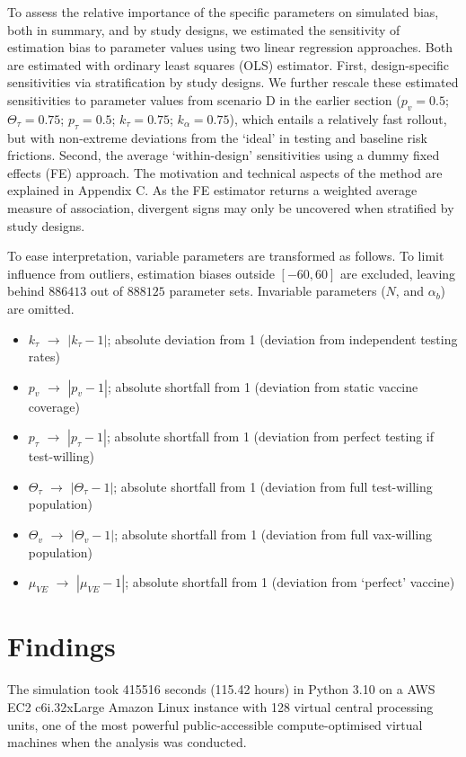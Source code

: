 \documentclass[12pt]{article}
\begin{document}
To assess the relative importance of the specific parameters on simulated bias, both in summary, and by study designs, we estimated the sensitivity of estimation bias to parameter values using two linear regression approaches. Both are estimated with ordinary least squares (OLS) estimator. First, design-specific sensitivities via stratification by study designs. We further rescale these estimated sensitivities to parameter values from scenario D in the earlier section ($p_v=0.5$; $\Theta_{\tau}=0.75$; $p_\tau=0.5$; $k_\tau=0.75$; $k_\alpha=0.75$), which entails a relatively fast rollout, but with non-extreme deviations from the `ideal' in testing and baseline risk frictions. Second, the average `within-design' sensitivities using a dummy fixed effects (FE) approach. The motivation and technical aspects of the method are explained in Appendix C. As the FE estimator returns a weighted average measure of association, divergent signs may only be uncovered when stratified by study designs.

To ease interpretation, variable parameters are transformed as follows. To limit influence from outliers, estimation biases outside $[-60, 60]$ are excluded, leaving behind $886413$ out of $888125$ parameter sets. Invariable parameters ($N$, and $\alpha_{b}$) are omitted.
\begin{itemize}
	\item $k_\tau$ $\rightarrow$ $|k_\tau - 1|$; absolute deviation from 1 (deviation from independent testing rates)
	\item $p_v$ $\rightarrow$ $|p_v - 1|$; absolute shortfall from 1 (deviation from static vaccine coverage)
	\item $p_\tau$ $\rightarrow$ $|p_\tau - 1|$; absolute shortfall from 1 (deviation from perfect testing if test-willing)
	\item $\Theta_\tau$ $\rightarrow$ $|\Theta_\tau - 1|$; absolute shortfall from 1 (deviation from full test-willing population)
	\item $\Theta_{v}$ $\rightarrow$ $|\Theta_{v} - 1|$; absolute shortfall from 1 (deviation from full vax-willing population)
	\item $\mu_{VE}$ $\rightarrow$ $|\mu_{VE} - 1|$; absolute shortfall from 1 (deviation from `perfect' vaccine)
\end{itemize}

\section{Findings}
The simulation took 415516 seconds (115.42 hours) in Python 3.10 on a AWS EC2 c6i.32xLarge Amazon Linux instance with 128 virtual central processing units, one of the most powerful public-accessible compute-optimised virtual machines when the analysis was conducted.
\end{document}

